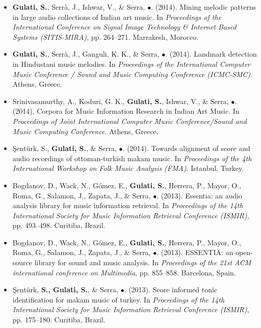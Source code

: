 \begin{itemize}[leftmargin=*]
	\item \textbf{Gulati, S.},  Serr{\`a}, J., Ishwar, V., \& Serra, $\bullet$. (2014). Mining melodic patterns in large audio collections of Indian art music. In \textit{Proceedings of the International Conference on Signal Image Technology \& Internet Based Systems (SITIS-MIRA)}, pp. 264–271. Marrakesh, Morocco.
	\item \textbf{Gulati, S.}, Serr{\`a}, J., Ganguli, K. K., \& Serra, $\bullet$. (2014). Landmark detection in Hindustani music melodies. In \textit{Proceedings of the International Computer Music Conference / Sound and Music Computing Conference (ICMC-SMC)}. Athens, Greece. 
	\item Srinivasamurthy, A., Koduri, G. K., \textbf{Gulati, S.}, Ishwar, V., \& Serra, $\bullet$. (2014). Corpora for Music Information Research in Indian Art Music. In \textit{Proceedings of Joint International Computer Music Conference/Sound and Music Computing Conference}. Athens, Greece. 
	\item \c{S}ent{\"u}rk, S., \textbf{Gulati, S.}, \& Serra, $\bullet$. (2014). Towards alignment of score and audio recordings of ottoman-turkish makam music. In \textit{Proceedings of the 4th International Workshop on Folk Music Analysis (FMA)}. Istanbul, Turkey. 
	\item Bogdanov, D., Wack, N., G{\'o}mez, E., \textbf{Gulati, S.}, Herrera, P., Mayor, O., Roma, G., Salamon, J., Zapata, J., \& Serra, $\bullet$. (2013). Essentia: an audio analysis library for music information retrieval. In \textit{Proceedings of the 14th International Society for Music Information Retrieval Conference (ISMIR)}, pp. 493–498. Curitiba, Brazil.
	\item Bogdanov, D., Wack, N., G{\'o}mez, E., \textbf{Gulati, S.}, Herrera, P., Mayor, O., Roma, G., Salamon, J., Zapata, J., \& Serra, $\bullet$. (2013). ESSENTIA: an open-source library for sound and music analysis. In \textit{Proceedings of the 21st ACM international conference on Multimedia}, pp. 855–858. Barcelona, Spain.
	\item \c{S}ent{\"u}rk, \textbf{S., Gulati, S.}, \& Serra, $\bullet$. (2013). Score informed tonic identification for makam music of turkey. In \textit{Proceedings of the 14th International Society for Music Information Retrieval Conference (ISMIR)}, pp. 175–180. Curitiba, Brazil.

\end{itemize}
